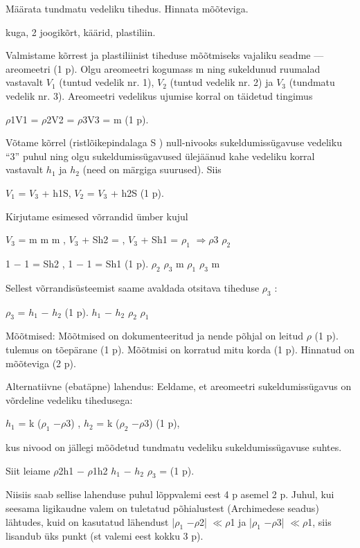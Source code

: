 
Määrata tundmatu vedeliku tihedus. Hinnata mõõteviga.

kuga, 2 joogikõrt, käärid, plastiliin.

\hint

\solu
Valmistame kõrrest ja plastiliinist tiheduse mõõtmiseks vajaliku seadme --- areomeetri (1 p). Olgu areomeetri kogumass m ning sukeldunud ruumalad vastavalt $V_1$ (tuntud vedelik nr. 1), $V_2$ (tuntud vedelik nr. 2) ja $V_3$ (tundmatu vedelik nr. 3). Areomeetri vedelikus ujumise korral on täidetud tingimus

$\rho$1V1 = $\rho$2V2 = $\rho$3V3 = m (1 p).

Võtame kõrrel (ristlõikepindalaga S ) null-nivooks sukeldumissügavuse vedeliku ``3'' puhul ning olgu sukeldumissügavused ülejäänud kahe vedeliku korral vastavalt $h_1$ ja $h_2$ (need on märgiga suurused). Siis

$V_1$ = $V_3$ + h1S, $V_2$ = $V_3$ + h2S (1 p).

Kirjutame esimesed võrrandid ümber kujul

$V_3$ = m m m , $V_3$ + Sh2 = , $V_3$ + Sh1 = $\rho_1$ $\Rightarrow \rho$3 $\rho_2$

1 $-$ 1 = Sh2 , 1 $-$ 1 = Sh1 (1 p). $\rho_2$ $\rho_3$ m $\rho_1$ $\rho_3$ m

Sellest võrrandisüsteemist saame avaldada otsitava tiheduse $\rho_3$ :

$\rho_3$ = $h_1$ $-$ $h_2$ (1 p). $h_1$ $-$ $h_2$ $\rho_2$ $\rho_1$

Mõõtmised: Mõõtmised on dokumenteeritud ja nende põhjal on leitud $\rho$ (1 p). tulemus on tõepärane (1 p). Mõõtmisi on korratud mitu korda (1 p). Hinnatud on mõõteviga (2 p).

Alternatiivne (ebatäpne) lahendus: Eeldame, et areomeetri sukeldumissügavus on võrdeline vedeliku tihedusega:

$h_1$ = k ($\rho_1$ $- \rho$3) , $h_2$ = k ($\rho_2$ $- \rho$3) (1 p),

kus nivood on jällegi mõõdetud tundmatu vedeliku sukeldumissügavuse suhtes.

Siit leiame $\rho$2h1 $-$ $\rho$1h2 $h_1$ $-$ $h_2$ $\rho_3$ = (1 p).

Niisiis saab sellise lahenduse puhul lõppvalemi eest 4 p asemel 2 p. Juhul, kui seesama ligikaudne valem on tuletatud põhialustest (Archimedese seadus) lähtudes, kuid on kasutatud lähendust |$\rho_1$ $- \rho$2| $\ll \rho$1 ja |$\rho_1$ $- \rho$3| $\ll \rho$1, siis lisandub üks punkt (st valemi eest kokku 3 p).
\probend
